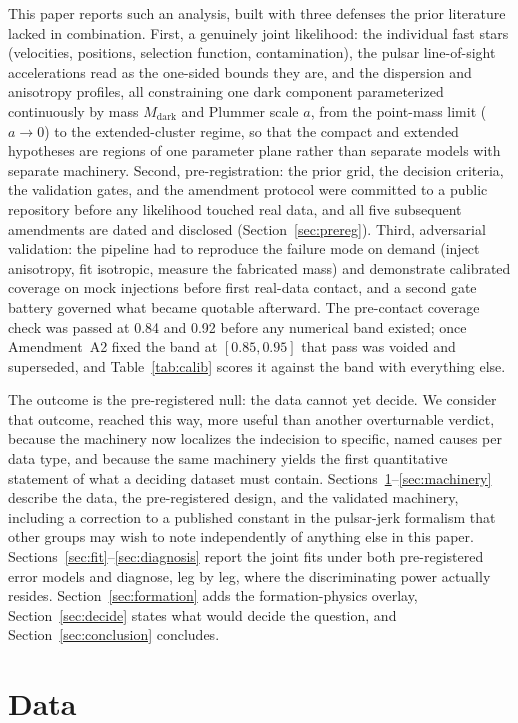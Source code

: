 \documentclass[11pt]{article}
\newcommand{\mdark}{\ensuremath{M_{\mathrm{dark}}}}
\begin{document}
This paper reports such an analysis, built with three defenses the prior literature lacked in combination. First, a genuinely joint likelihood: the individual fast stars (velocities, positions, selection function, contamination), the pulsar line-of-sight accelerations read as the one-sided bounds they are, and the dispersion and anisotropy profiles, all constraining one dark component parameterized continuously by mass \mdark{} and Plummer scale $a$, from the point-mass limit ($a \to 0$) to the extended-cluster regime, so that the compact and extended hypotheses are regions of one parameter plane rather than separate models with separate machinery. Second, pre-registration: the prior grid, the decision criteria, the validation gates, and the amendment protocol were committed to a public repository before any likelihood touched real data, and all five subsequent amendments are dated and disclosed (Section~\ref{sec:prereg}). Third, adversarial validation: the pipeline had to reproduce the \citet{Aros2020} failure mode on demand (inject anisotropy, fit isotropic, measure the fabricated mass) and demonstrate calibrated coverage on mock injections before first real-data contact, and a second gate battery governed what became quotable afterward. The pre-contact coverage check was passed at 0.84 and 0.92 before any numerical band existed; once Amendment~A2 fixed the band at $[0.85, 0.95]$ that pass was voided and superseded, and Table~\ref{tab:calib} scores it against the band with everything else.

The outcome is the pre-registered null: the data cannot yet decide. We consider that outcome, reached this way, more useful than another overturnable verdict, because the machinery now localizes the indecision to specific, named causes per data type, and because the same machinery yields the first quantitative statement of what a deciding dataset must contain. Sections~\ref{sec:data}--\ref{sec:machinery} describe the data, the pre-registered design, and the validated machinery, including a correction to a published constant in the pulsar-jerk formalism that other groups may wish to note independently of anything else in this paper. Sections~\ref{sec:fit}--\ref{sec:diagnosis} report the joint fits under both pre-registered error models and diagnose, leg by leg, where the discriminating power actually resides. Section~\ref{sec:formation} adds the formation-physics overlay, Section~\ref{sec:decide} states what would decide the question, and Section~\ref{sec:conclusion} concludes.

\section{Data}
\label{sec:data}
\end{document}

